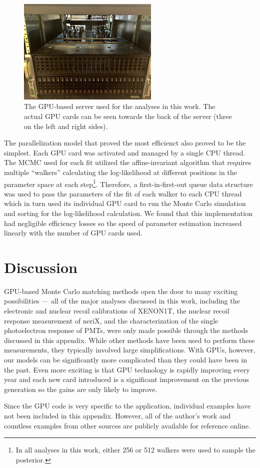 \begin{figure}[t]
        \centering
	\includegraphics[width=0.6\textwidth]{gpu_server}
	\caption{The GPU-based server used for the analyses in this work.  The actual GPU cards can be seen towards the back of the server (three on the left and right sides).}
	\label{fig:gpu_server}
\end{figure}


The parallelization model that proved the most efficienct also proved to be the simplest.  Each GPU card was activated and managed by a single CPU thread.  The MCMC used for each fit utilized the affine-invariant algorithm \cite{foreman2013emcee} that requires multiple ``walkers'' calculating the log-likelihood at different positions in the parameter space at each step\footnote{In all analyses in this work, either 256 or 512 walkers were used to sample the posterior.}.  Therefore, a first-in-first-out queue data structure was used to pass the parameters of the fit of each walker to each CPU thread which in turn used its individual GPU card to run the Monte Carlo simulation and sorting for the log-likelihood calculation.  We found that this implementation had negligible efficiency losses so the speed of parameter estimation increased linearly with the number of GPU cards used.


\section{Discussion}


GPU-based Monte Carlo matching methods open the door to many exciting possibilities --- all of the major analyses discussed in this work, including the electronic and nuclear recoil calibrations of XENON1T, the nuclear recoil response measurement of neriX, and the characterization of the single photoelectron response of PMTs, were only made possible through the methods discussed in this appendix.  While other methods have been used to perform these measurements, they typically involved large simplifications.  With GPUs, however, our models can be significantly more complicated than they could have been in the past.  Even more exciting is that GPU technology is rapidly improving every year and each new card introduced is a significant improvement on the previous generation so the gains are only likely to improve.

Since the GPU code is very specific to the application, individual examples have not been included in this appendix.  However, all of the author's work and countless examples from other sources are publicly available for reference online.





